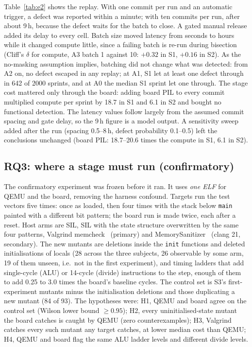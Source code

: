 \documentclass[conference]{IEEEtran}
\begin{document}
Table~\ref{tab:e2} shows the replay. With one commit per run and an automatic trigger, a defect was
reported within a minute; with ten commits per run, after about 9\,h, because the defect waits for the batch
to close. A gated manual release added its delay to every cell. Batch size moved latency from seconds to hours
while it changed compute little, since a failing batch is re-run during bisection (Cliff's $\delta$ for
compute, A3 batch 1 against 10: $+0.32$ in S1, $+0.16$ in S2). As the no-masking assumption implies, batching did
not change what was detected: from A2 on, no defect escaped in any replay; at A1, S1 let at least one defect
through in 642 of 2000 sprints, and at A0 the median S1 sprint let one through.
The stage cost mattered only through the board: adding board PIL to every commit multiplied compute per
sprint by 18.7 in S1 and 6.1 in S2 and bought no functional detection. The latency values follow largely
from the assumed commit spacing and gate delay, so the 9\,h figure is a model output. A sensitivity sweep
added after the run (spacing 0.5--8\,h, defect probability 0.1--0.5) left the conclusions unchanged (board
PIL: 18.7--20.6 times the compute in S1, 6.1 in S2).

\subsection{RQ3: where a stage must run (confirmatory)}

The confirmatory experiment was frozen before it ran. It uses \emph{one ELF} for QEMU and the board, removing the harness confound. Targets run the test vectors five times: once
as loaded, then four times with the stack below \texttt{main} painted with a different bit pattern; the board
run is made twice, each after a reset. Host arms are SIL, SIL with the state structure overwritten by the same four
patterns, Valgrind memcheck~\cite{nethercote2007} (primary) and MemorySanitizer~\cite{stepanov2015}
(clang 21, secondary). The new mutants are deletions inside the \texttt{init} functions and deleted
initialisations of locals (28 across the three subjects, 26 observable by some arm, 19 of them unseen, i.e.\
not in the first experiment), and timing ladders that add single-cycle (ALU) or 14-cycle (divide)
instructions to the step, enough of them to add 0.25 to 3.0 times the board's baseline cycles. The control set is
S3's first-experiment mutants minus the initialisation deletions and those duplicating a new mutant (84 of 93). The hypotheses were: H1, QEMU and board agree on the control set (Wilson lower
bound $\geq 0.95$); H2, every uninitialised-state mutant the board catches is caught by QEMU (zero
counterexamples); H3, Valgrind catches every such mutant any target catches, at lower median cost than
QEMU; H4, QEMU and board flag the same ALU ladder levels and different divide levels.
\end{document}
